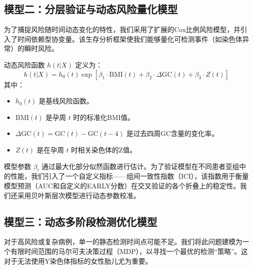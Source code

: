 \documentclass[UTF8, a4paper, 11pt]{ctexart}
\begin{document}
\subsection{模型二：分层验证与动态风险量化模型}
为了捕捉风险随时间动态变化的特性，我们采用了扩展的Cox比例风险模型，并引入了时间依赖型协变量。该生存分析框架使我们能够量化可检测事件（如染色体异常）的瞬时风险。

动态风险函数 $h(t|X)$ 定义为：
\begin{equation}
h(t|X) = h_0(t) \exp[\beta_1 \cdot \text{BMI}(t) + \beta_2 \cdot \Delta\text{GC}(t) + \beta_3 \cdot Z(t)]
\end{equation}
其中：
\begin{itemize}
    \item $h_0(t)$ 是基线风险函数。
    \item $\text{BMI}(t)$ 是孕周 $t$ 时的标准化BMI值。
    \item $\Delta\text{GC}(t) = \text{GC}(t) - \text{GC}(t-4)$ 是过去四周GC含量的变化率。
    \item $Z(t)$ 是在孕周 $t$ 时相关染色体的Z值。
\end{itemize}
模型参数 $\beta_i$ 通过最大化部分似然函数进行估计。为了验证模型在不同患者亚组中的性能，我们引入了一个自定义指标——组间一致性指数（ICI），该指数用于衡量模型预测（AUC和自定义的EARLY分数）在交叉验证的各个折叠上的稳定性。我们还采用贝叶斯层次模型进行动态参数校准。

\subsection{模型三：动态多阶段检测优化模型}
对于高风险或复杂病例，单一的静态检测时间点可能不足。我们将此问题建模为一个有限时间范围的马尔可夫决策过程（MDP），以寻找一个最优的检测“策略”。这对于无法使用Y染色体指标的女性胎儿尤为重要。
\end{document}
